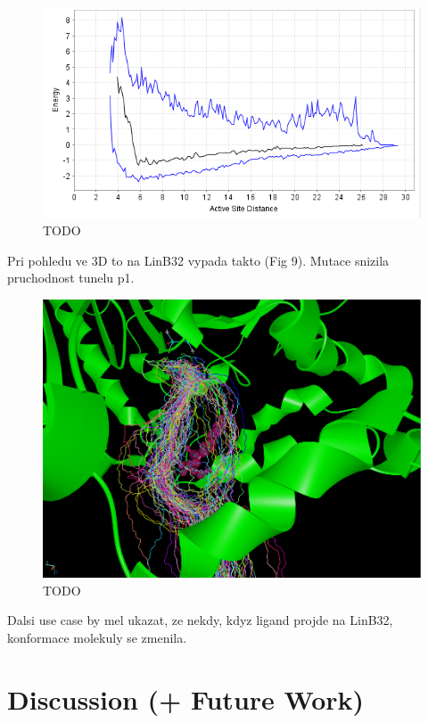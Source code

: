 \documentclass{vgtc}                          %
\begin{document}
\begin{figure}[h]
  \centering
  \includegraphics[width=\columnwidth]{cs01-linbwt-sel-02}
  \caption{TODO}
\end{figure}

Pri pohledu ve 3D to na LinB32 vypada takto (Fig 9).
Mutace snizila pruchodnost tunelu p1.

\begin{figure}[h]
  \centering
  \includegraphics[width=\columnwidth]{cs01-linb32-sel-success-3d}
  \caption{TODO}
\end{figure}

Dalsi use case by mel ukazat, ze nekdy, kdyz ligand projde na LinB32, konformace molekuly se zmenila.

\section{Discussion (+ Future Work)}
\label{sec:discussion}
\end{document}
